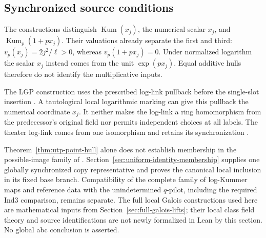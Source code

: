 \subsection{Synchronized source conditions}

The constructions distinguish
$\operatorname{Kum}(x_j)$, the numerical scalar $x_j$,
and $\operatorname{Kum}_p(1+px_j)$.
Their valuations already separate the first and third:
$v_p(x_j)=2j^2/\ell>0$, whereas $v_p(1+px_j)=0$.
Under normalized logarithm the scalar $x_j$ instead comes
from the unit $\exp(px_j)$. Equal additive hulls therefore
do not identify the multiplicative inputs.

The LGP construction uses the prescribed log-link pullback
before the single-slot insertion
\cite[Propositions~3.4(ii) and 3.5, pp.~102--106]{IUT3}.
A tautological local logarithmic marking can give this
pullback the numerical coordinate $x_j$. It neither makes
the log-link a ring homomorphism from the predecessor's
original field nor permits independent choices at all labels.
The theater log-link comes from one isomorphism and retains
its synchronization
\cite[Proposition~1.3(i) and Remark~1.3.1, pp.~42--43]{IUT3}.

Theorem~\ref{thm:utp-point-hull} alone does not establish
membership in the possible-image family of
\cite[Corollary~3.12, pp.~173--175]{IUT3}.
Section~\ref{sec:uniform-identity-membership} supplies one
globally synchronized copy representative and proves the
canonical local inclusion in its fixed base branch.
Compatibility of the complete family of log-Kummer maps
and reference data with the unindetermined $q$-pilot,
including the required Ind3 comparison, remains separate.
The full local Galois constructions used here are mathematical
inputs from Section~\ref{sec:full-galois-lifts}; their local
class field theory and source identifications are not newly
formalized in Lean by this section. No global abc conclusion
is asserted.
